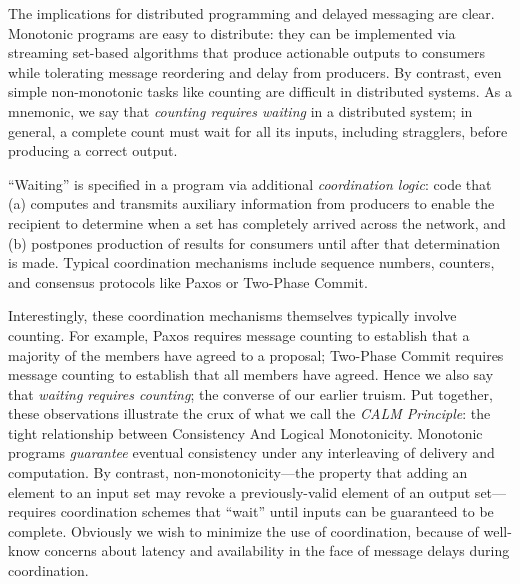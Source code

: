 The implications for distributed programming and delayed messaging are clear. Monotonic programs are easy to distribute: they can be implemented via streaming set-based algorithms that produce actionable outputs to consumers while tolerating message reordering and delay from producers.  By contrast, even simple non-monotonic tasks like counting are difficult in distributed systems.  As a mnemonic, we say that \emph{counting requires waiting} in a distributed system; in general, a complete count must wait for all its inputs, including stragglers, before producing a correct output.

``Waiting'' is specified in a program via additional \emph{coordination logic}: code that (a) computes and transmits auxiliary information from producers to enable the recipient to determine when a set has completely arrived across the network, and (b) postpones production of results for consumers until after that determination is made.  Typical coordination mechanisms include sequence numbers, counters, and consensus protocols like Paxos or Two-Phase Commit.

Interestingly, these coordination mechanisms themselves typically involve counting.  For example, Paxos requires message counting to establish that a majority of the members have agreed to a proposal; Two-Phase Commit requires message counting to establish  that all members have agreed.  Hence we also say that {\em waiting requires counting}; the converse of our earlier truism.  Put together, these observations illustrate the crux of what we call the {\em CALM Principle}: the tight relationship between Consistency And Logical Monotonicity.  Monotonic programs \emph{guarantee} eventual consistency under any interleaving of delivery and computation.  By contrast, non-monotonicity---the property that adding an element to an input set may revoke a previously-valid element of an output set---requires coordination schemes that ``wait'' until inputs can be guaranteed to be complete.  Obviously we wish to minimize the use of coordination, because of well-know concerns about latency and availability in the face of message delays during coordination.

